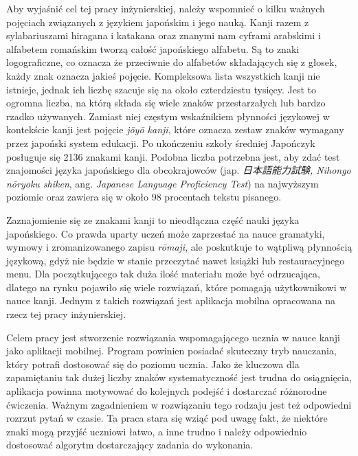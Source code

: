 \documentclass[a4paper,twoside,12pt]{book}
\newcommand{\obcy}[1]{\emph{#1}}
\newcommand{\english}[1]{{\selectlanguage{british}\obcy{#1}}}
\newcommand{\japanese}[1]{{\selectlanguage{japanese}\obcy{#1}}}
\begin{document}
Aby wyjaśnić cel tej pracy inżynierskiej, należy wspomnieć o kilku ważnych pojęciach związanych z językiem japońskim i jego nauką. Kanji razem z sylabariuszami hiragana i katakana oraz znanymi nam cyframi arabskimi i alfabetem romańskim tworzą całość japońskiego alfabetu. Są to znaki logograficzne, co oznacza że przeciwnie do alfabetów składających się z głosek, każdy znak oznacza jakieś pojęcie. Kompleksowa lista wszystkich kanji nie istnieje, jednak ich liczbę szacuje się na około czterdziestu tysięcy. Jest to ogromna liczba, na którą składa się wiele znaków przestarzałych lub bardzo rzadko używanych. Zamiast niej częstym wskaźnikiem płynności językowej w kontekście kanji jest pojęcie \textit{jōyō kanji}, które oznacza zestaw znaków wymagany przez japoński system edukacji. Po ukończeniu szkoły średniej Japończyk posługuje się 2136 znakami kanji. Podobna liczba potrzebna jest, aby zdać test znajomości języka japońskiego dla obcokrajowców (jap. \japanese{日本語能力試験, Nihongo nōryoku shiken}, ang. \english{Japanese Language Proficiency Test}) na najwyższym poziomie oraz zawiera się w około 98 procentach tekstu pisanego.

Zaznajomienie się ze znakami kanji to nieodłączna część nauki języka japońskiego. Co prawda uparty uczeń może zaprzestać na nauce gramatyki, wymowy i zromanizowanego zapisu \textit{rōmaji}, ale poskutkuje to wątpliwą płynnością językową, gdyż nie będzie w stanie przeczytać nawet książki lub restauracyjnego menu. Dla początkującego tak duża ilość materiału może być odrzucająca, dlatego na rynku pojawiło się wiele rozwiązań, które pomagają użytkownikowi w nauce kanji. Jednym z takich rozwiązań jest aplikacja mobilna opracowana na rzecz tej pracy inżynierskiej.

Celem pracy jest stworzenie rozwiązania wspomagającego ucznia w nauce kanji jako aplikacji mobilnej. Program powinien posiadać skuteczny tryb nauczania, który potrafi dostosować się do poziomu ucznia. Jako że kluczowa dla zapamiętaniu tak dużej liczby znaków systematyczność jest trudna do osiągnięcia, aplikacja powinna motywować do kolejnych podejść i dostarczać różnorodne ćwiczenia. Ważnym zagadnieniem w rozwiązaniu tego rodzaju jest też odpowiedni rozrzut pytań w czasie. Ta praca stara się wziąć pod uwagę fakt, że niektóre znaki mogą przyjść uczniowi łatwo, a inne trudno i należy odpowiednio dostosować algorytm dostarczający zadania do wykonania.
\end{document}

